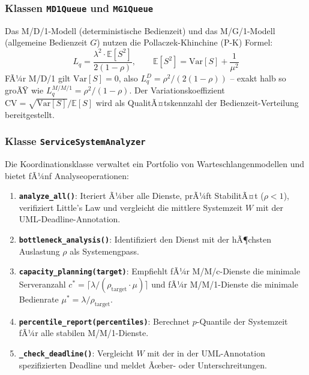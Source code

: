 ﻿\documentclass[a4paper,12pt]{scrreprt}
\theoremstyle{definition}
\begin{document}
\subsubsection{Klassen \texttt{MD1Queue} und \texttt{MG1Queue}}

Das M/D/1-Modell (deterministische Bedienzeit) und das M/G/1-Modell
(allgemeine Bedienzeit $G$) nutzen die Pollaczek-Khinchine (P-K) Formel:
\begin{equation}
	L_q = \frac{\lambda^2 \cdot \mathbb{E}[S^2]}{2(1-\rho)}, \qquad
	\mathbb{E}[S^2] = \mathrm{Var}[S] + \frac{1}{\mu^2}
\end{equation}
FÃ¼r M/D/1 gilt $\mathrm{Var}[S]=0$, also $L_q^{D} = \rho^2/(2(1-\rho))$
-- exakt halb so groÃŸ wie $L_q^{M/M/1} = \rho^2/(1-\rho)$.
Der Variationskoeffizient $\mathrm{CV} = \sqrt{\mathrm{Var}[S]} / \mathbb{E}[S]$
wird als QualitÃ¤tskennzahl der Bedienzeit-Verteilung bereitgestellt.

\subsubsection{Klasse \texttt{ServiceSystemAnalyzer}}

Die Koordinationsklasse verwaltet ein Portfolio von Warteschlangenmodellen
und bietet fÃ¼nf Analyseoperationen:

\begin{enumerate}
	\item[-] \textbf{\texttt{analyze\_all()}}: Iteriert Ã¼ber alle Dienste,
	prÃ¼ft StabilitÃ¤t ($\rho < 1$), verifiziert Little's Law und
	vergleicht die mittlere Systemzeit $W$ mit der UML-Deadline-Annotation.
	\item[-] \textbf{\texttt{bottleneck\_analysis()}}: Identifiziert den
	Dienst mit der hÃ¶chsten Auslastung $\rho$ als Systemengpass.
	\item[-] \textbf{\texttt{capacity\_planning(target)}}:
	Empfiehlt fÃ¼r M/M/c-Dienste die minimale Serveranzahl
	$c^* = \lceil \lambda / (\rho_\text{target} \cdot \mu) \rceil$
	und fÃ¼r M/M/1-Dienste die minimale Bedienrate
	$\mu^* = \lambda / \rho_\text{target}$.
	\item[-] \textbf{\texttt{percentile\_report(percentiles)}}:
	Berechnet $p$-Quantile der Systemzeit fÃ¼r alle stabilen M/M/1-Dienste.
	\item[-] \textbf{\texttt{\_check\_deadline()}}: Vergleicht $W$ mit der
	in der UML-Annotation spezifizierten Deadline und meldet Ãœber- oder
	Unterschreitungen.
\end{enumerate}
\end{document}
